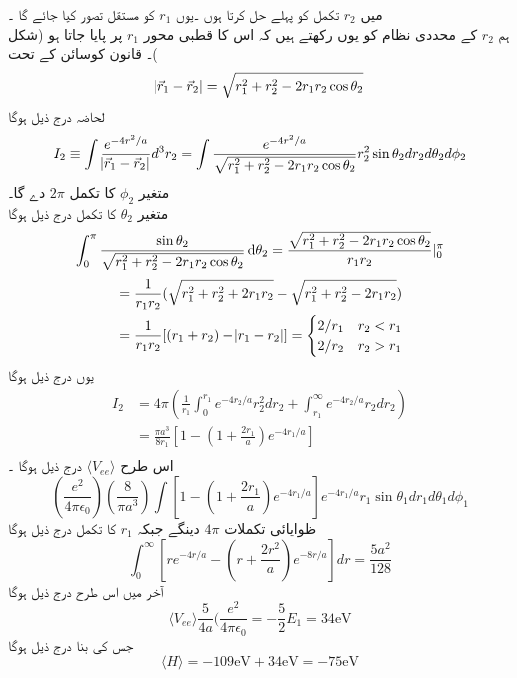 میں 
\(r_{2}\)
 تکمل کو پہلے حل کرتا ہوں ۔یوں
  \(r_{1}\)
کو مستقل تصور کیا جائے گا ۔\\
ہم 
\(r_{2}\)
کے  محددی نظام کو یوں رکھتے ہیں کہ اس کا  قطبی محور
 \(r_{1}\)
پر پایا جاتا ہو (شکل )۔
قانون  کوسائن کے تحت 
\[\abs{\vec{r}_{1}-\vec{r}_{2}}=\sqrt{r_{1}^{2}+r_{2}^{2}-2r_{1}r_{2}\cos{\theta_{2}}}\]
لحاضہ درج ذیل ہوگا \\
\[I_{2}\equiv\int\frac{e^{-4r^{2}/a}}{\abs{\vec{r}_{1}-\vec{r}_{2}}}d^{3}r_{2}=\int\frac{e^{-4r^{2}/a}}{\sqrt{r_{1}^{2}+r_{2}^{2}-2r_{1}r_{2}\cos{\theta_{2}}}}r_{2}^{2}\sin{\theta_{2}}dr_{2}d\theta_{2}d\phi_{2}\]
متغیر 
\(\phi_{2}\)
کا تکمل 
\(2\pi\)
 دے گا۔\\
متغیر 
\(\theta_{2}\)
 کا تکمل  درج ذیل ہوگا
\begin{align*}
\int_{0}^{\pi}\frac{\sin{\theta_{2}}}{\sqrt{r_{1}^{2}+r_{2}^{2}-2r_{1}r_{2}\cos{\theta_{2}}}}\dif{\theta_{2}}=\frac{\sqrt{r_{1}^{2}+r_{2}^{2}-2r_{1}r_{2}\cos{\theta_{2}}}}{r_{1}r_{2}}|_{0}^{\pi}
\end{align*}
\begin{align*}
&=\frac{1}{r_{1}r_{2}}(\sqrt{r_{1}^{2}+r_{2}^{2}+2r_{1}r_{2}}-\sqrt{r_{1}^{2}+r_{2}^{2}-2r_{1}r_{2}})\\
&=\frac{1}{r_{1}r_{2}}[(r_{1}+r_{2})-\abs{r_{1}-r_{2}}]=\begin{cases}
2/r_{1} & r_{2}<r_{1}\\
2/r_{2}&r_{2}>r_{1}\\
\end{cases}\\
\end{align*}
یوں درج ذیل ہوگا 
\begin{align*}
I_{2}&=4\pi(\frac{1}{r_{1}}\int_{0}^{r_{1}}e^{-4r_{2}/a}r_{2}^{2}dr_{2}+\int_{r_{1}}^{\infty}e^{-4r_{2}/a}r_{2}dr_{2})\\
&=\frac{\pi a^{3}}{8r_{1}}[1-(1+\frac{2r_{1}}{a})e^{-4r_{1}/a}]\\
\end{align*}
اس طرح 
\(\langle V_{ee} \rangle \)
درج ذیل ہوگا ۔
\[(\frac{e^{2}}{4\pi\epsilon_{0}})(\frac{8}{\pi a^{3}})\int[1-(1+\frac{2r_{1}}{a})e^{-4r_{1}/a}]e^{-4r_{1}/a}r_{1}\sin{\theta_{1}}dr_{1}d\theta_{1}d\phi_{1}\]
ظوایائی تکملات 
\(4\pi\)
دینگے جبکہ 
\(r_{1}\)
 کا تکمل درج ذیل ہوگا
\[\int_{0}^{\infty}[re^{-4r/a}-(r+\frac{2r^{2}}{a})e^{-8r/a}]dr=\frac{5a^{2}}{128}\]
آخر میں اس طرح درج ذیل ہوگا 
\[\langle V_{ee} \rangle\frac{5}{4a}(\frac{e^{2}}{4\pi\epsilon_{0}}=-\frac{5}{2}E_{1}=34\text{eV}\]
جس کی بنا درج ذیل ہوگا 
\[\langle H \rangle =-109 \text{eV}+34 \text{eV}=-75\text{eV}\]
